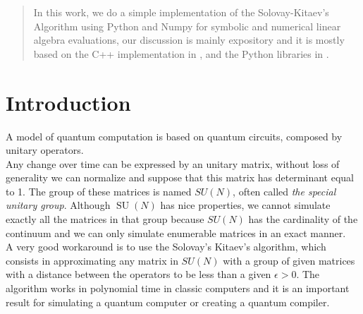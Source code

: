 \documentclass[a0,portrait]{a0poster}
\begin{document}
	\begin{multicols}{2} %
		
		
		\color{Navy} %
		
		\begin{abstract}
			In this work, we do a simple implementation of the Solovay-Kitaev's Algorithm using Python and Numpy for symbolic and numerical linear algebra evaluations, our discussion is mainly expository and it is mostly based on the C++ implementation in \cite{Harrow2001}, and the Python libraries in \cite{PaulPhamGit}.
		\end{abstract}
		
		
		\color{SaddleBrown} %
		
		\section*{Introduction}
		
		\large{A} model of quantum computation is based on quantum circuits, composed by unitary operators.
		\\
		Any change over time can be expressed by an unitary matrix, without loss of generality we can normalize and suppose that this matrix has determinant equal to 1. The group of these matrices is named $SU(N)$, often called \emph{the special unitary group}. Although $ \operatorname{SU}(N)  $ has nice properties, we cannot simulate exactly all the matrices in that group because $SU(N)$ has the cardinality of the continuum \cite{Nielsen2000} and we can only simulate enumerable matrices in an exact manner.
		\\
		A very good workaround is to use the Solovay's Kitaev's algorithm, which consists in approximating any matrix in $SU(N)$ with a group of given matrices with a distance between the operators to be less than a given $\epsilon>0$. The algorithm works in polynomial time in classic computers and it is an important result for simulating a quantum computer or creating a quantum compiler.
		

\end{multicols}
\end{document}
